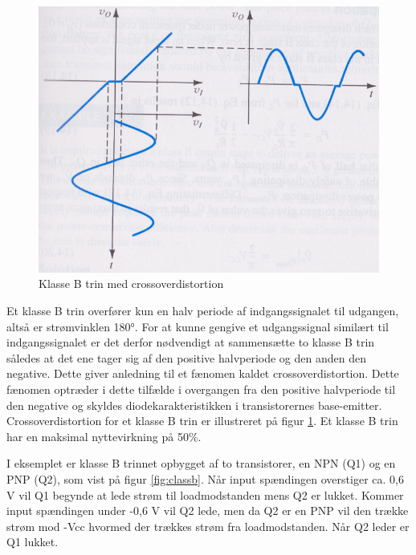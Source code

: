 \begin{figure}[ht]
\begin{minipage}[b]{0.5\linewidth}
\includegraphics[scale=.25]{indledende_analyse/klasser/klassebproblem.png}
\caption{Klasse B trin med crossoverdistortion}
\label{fig:classbproblem}
\end{minipage}
\end{figure}

Et klasse B trin overfører kun en halv periode af indgangssignalet til udgangen, altså er strømvinklen 180°. For at kunne gengive et udgangssignal similært til indgangssignalet er det derfor nødvendigt at sammensætte to klasse B trin således at det ene tager sig af den positive halvperiode og den anden den negative. Dette giver anledning til et fænomen kaldet crossoverdistortion. Dette fænomen optræder i dette tilfælde i overgangen fra den positive halvperiode til den negative og skyldes diodekarakteristikken i transistorernes base-emitter. Crossoverdistortion for et klasse B trin er illustreret på figur \ref{fig:classbproblem}.
Et klasse B trin har en maksimal nyttevirkning på 50\%.

I eksemplet er klasse B trinnet opbygget af to transistorer, en NPN (Q1) og en PNP (Q2), som vist på figur \ref{fig:classb}. Når input spændingen overstiger ca. 0,6 V vil Q1 begynde at lede strøm til loadmodstanden mens Q2 er lukket. Kommer input spændingen under -0,6 V vil Q2 lede, men da Q2 er en PNP vil den trække strøm mod -Vcc hvormed der trækkes strøm fra loadmodstanden. Når Q2 leder er Q1 lukket. 

